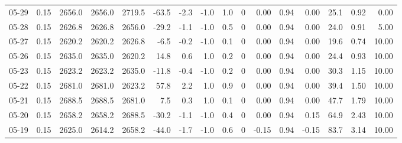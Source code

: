 \begin{threeparttable}
{\begin{tabular}{lrrrrrrrrrrrrrrr}
  05-29 &     0.15 & 2656.0 & 2656.0 & 2719.5 &      -63.5 &           -2.3 &                     -1.0 &                 1.0 &              0 &       0.00 &      0.94 &           0.00 &             25.1 &            0.92 &                   0.00 \\
  05-28 &     0.15 & 2626.8 & 2626.8 & 2656.0 &      -29.2 &           -1.1 &                     -1.0 &                 0.5 &              0 &       0.00 &      0.94 &           0.00 &             24.0 &            0.91 &                   5.00 \\
  05-27 &     0.15 & 2620.2 & 2620.2 & 2626.8 &       -6.5 &           -0.2 &                     -1.0 &                 0.1 &              0 &       0.00 &      0.94 &           0.00 &             19.6 &            0.74 &                  10.00 \\
  05-26 &     0.15 & 2635.0 & 2635.0 & 2620.2 &       14.8 &            0.6 &                      1.0 &                 0.2 &              0 &       0.00 &      0.94 &           0.00 &             24.4 &            0.93 &                  10.00 \\
  05-23 &     0.15 & 2623.2 & 2623.2 & 2635.0 &      -11.8 &           -0.4 &                     -1.0 &                 0.2 &              0 &       0.00 &      0.94 &           0.00 &             30.3 &            1.15 &                  10.00 \\
  05-22 &     0.15 & 2681.0 & 2681.0 & 2623.2 &       57.8 &            2.2 &                      1.0 &                 0.9 &              0 &       0.00 &      0.94 &           0.00 &             39.4 &            1.50 &                  10.00 \\
  05-21 &     0.15 & 2688.5 & 2688.5 & 2681.0 &        7.5 &            0.3 &                      1.0 &                 0.1 &              0 &       0.00 &      0.94 &           0.00 &             47.7 &            1.79 &                  10.00 \\
  05-20 &     0.15 & 2658.2 & 2658.2 & 2688.5 &      -30.2 &           -1.1 &                     -1.0 &                 0.4 &              0 &       0.00 &      0.94 &           0.15 &             64.9 &            2.43 &                  10.00 \\
  05-19 &     0.15 & 2625.0 & 2614.2 & 2658.2 &      -44.0 &           -1.7 &                     -1.0 &                 0.6 &              0 &      -0.15 &      0.94 &          -0.15 &             83.7 &            3.14 &                  10.00 \\

\end{tabular}}
\end{threeparttable}
